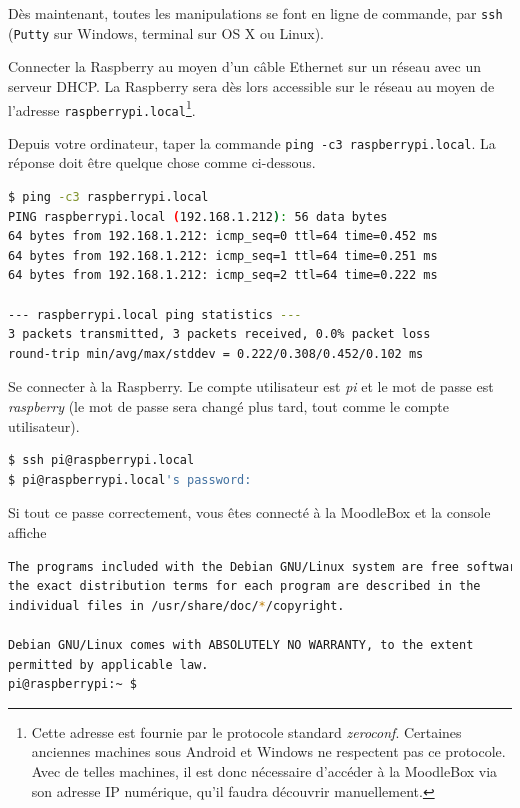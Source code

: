 \documentclass[11pt]{article}
\begin{document}
Dès maintenant, toutes les manipulations se font en ligne de commande, par \lstinline{ssh} (\lstinline{Putty} sur Windows, terminal sur OS X ou Linux).

Connecter la Raspberry au moyen d'un câble Ethernet sur un réseau avec un serveur DHCP. La Raspberry sera dès lors accessible sur le réseau au moyen de l'adresse \lstinline{raspberrypi.local}\footnote{Cette adresse est fournie par le protocole standard \emph{zeroconf}. Certaines anciennes machines sous Android et Windows ne respectent pas ce protocole. Avec de telles machines, il est donc nécessaire d'accéder à la MoodleBox via son adresse IP numérique, qu'il faudra découvrir manuellement.}.

\begin{verification}
Depuis votre ordinateur, taper la commande \lstinline{ping -c3 raspberrypi.local}. La réponse doit être quelque chose comme ci-dessous.

\begin{lstlisting}[language=bash]
$ ping -c3 raspberrypi.local
PING raspberrypi.local (192.168.1.212): 56 data bytes
64 bytes from 192.168.1.212: icmp_seq=0 ttl=64 time=0.452 ms
64 bytes from 192.168.1.212: icmp_seq=1 ttl=64 time=0.251 ms
64 bytes from 192.168.1.212: icmp_seq=2 ttl=64 time=0.222 ms

--- raspberrypi.local ping statistics ---
3 packets transmitted, 3 packets received, 0.0% packet loss
round-trip min/avg/max/stddev = 0.222/0.308/0.452/0.102 ms
\end{lstlisting}
\end{verification}

Se connecter à la Raspberry. Le compte utilisateur est \emph{pi} et le mot de passe est \emph{raspberry} (le mot de passe sera changé plus tard, tout comme le compte utilisateur).

\begin{lstlisting}[language=bash]
$ ssh pi@raspberrypi.local
$ pi@raspberrypi.local's password:
\end{lstlisting}

\begin{verification}
Si tout ce passe correctement, vous êtes connecté à la MoodleBox et la console affiche

\begin{lstlisting}[language=bash]
The programs included with the Debian GNU/Linux system are free software;
the exact distribution terms for each program are described in the
individual files in /usr/share/doc/*/copyright.

Debian GNU/Linux comes with ABSOLUTELY NO WARRANTY, to the extent
permitted by applicable law.
pi@raspberrypi:~ $
\end{lstlisting}
\end{verification}
\end{document}
